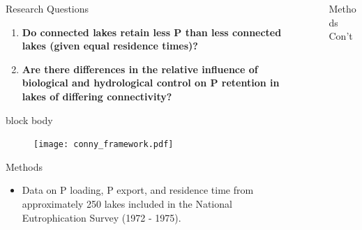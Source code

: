 \documentclass[final,hyperref={pdfpagelabels=false}]{beamer}
\begin{document}
\begin{frame}[t]
\begin{columns}[t]
\begin{column}{.465\textwidth}
\begin{block}{Research Questions}
\begin{enumerate} \large 
\item \textbf{Do connected lakes retain less P than less connected lakes (given equal residence times)?}
\vspace{1em}
\item \textbf{Are there differences in the relative influence of biological and hydrological control on P retention in lakes of differing connectivity?}
\end{enumerate}

\vspace{1em}
{
\begin{beamercolorbox}[wd=\textwidth,rounded=true]{block body}

\begin{figure}
  \texttt{[image: conny\_framework.pdf]}
\end{figure}

\end{beamercolorbox}
}
\vspace{0.5em}
\end{block}


\vspace{1em}

\begin{block}{Methods}

\begin{itemize}
\item Data on P loading, P export, and residence time from approximately 250 lakes included in the National Eutrophication Survey (1972 - 1975)\cite{StachelekNationalEutrophicationSurvey2017}.
\end{itemize}

\end{block}

\end{column} %

\begin{column}{.03\textwidth}\end{column} %
 
\begin{column}{.465\textwidth} %

\begin{block}{Methods Con't}


\end{block}
\end{column}
\end{columns}
\end{frame}
\end{document}
